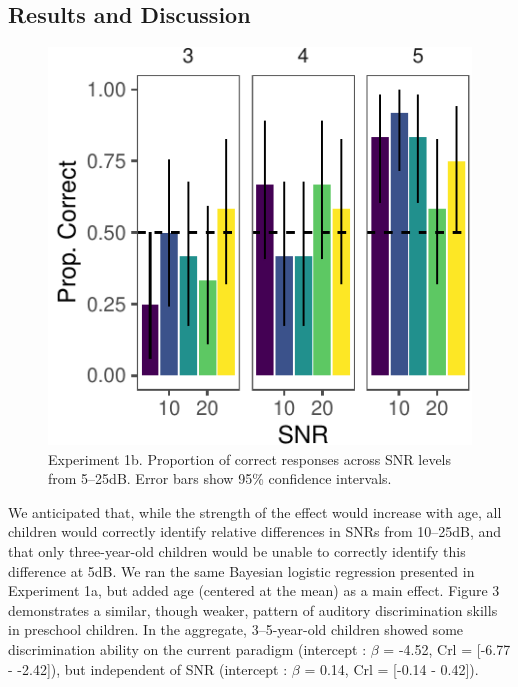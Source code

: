 \documentclass[10pt, letterpaper]{article}
\newenvironment{CodeChunk}{}{}
\begin{document}
\hypertarget{results-and-discussion-1}{%
\subsection{Results and Discussion}\label{results-and-discussion-1}}

\begin{CodeChunk}
\begin{figure}[t]

{\centering \includegraphics{figs/e1b-bar-1} 

}

\caption[Experiment 1b]{Experiment 1b. Proportion of correct responses across SNR levels from 5--25dB. Error bars show 95\% confidence intervals.}\label{fig:e1b-bar}
\end{figure}
\end{CodeChunk}

We anticipated that, while the strength of the effect would increase
with age, all children would correctly identify relative differences in
SNRs from 10--25dB, and that only three-year-old children would be
unable to correctly identify this difference at 5dB. We ran the same
Bayesian logistic regression presented in Experiment 1a, but added age
(centered at the mean) as a main effect. Figure 3 demonstrates a
similar, though weaker, pattern of auditory discrimination skills in
preschool children. In the aggregate, 3--5-year-old children showed some
discrimination ability on the current paradigm (intercept : \(\beta\) =
-4.52, Crl = {[}-6.77 - -2.42{]}), but independent of SNR (intercept :
\(\beta\) = 0.14, Crl = {[}-0.14 - 0.42{]}).
\end{document}
